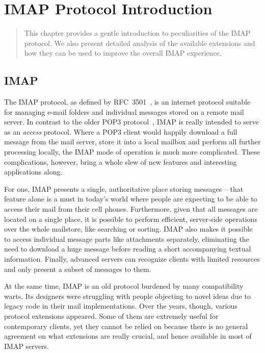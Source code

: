 \documentclass[trojita]{subfiles}
\begin{document}
\chapter{IMAP Protocol Introduction}
\label{sec:intro}

\begin{abstract}
This chapter provides a gentle introduction to peculiarities of the IMAP protocol.  We also present detailed analysis of
the available extensions and how they can be used to improve the overall IMAP experience.
\end{abstract}

\section{IMAP}

The IMAP protocol, as defined by RFC~3501~\cite{rfc-imap}, is an internet protocol suitable for managing e-mail folders
and individual messages stored on a remote mail server.  In contrast to the older POP3 protocol~\cite{rfc-pop3}, IMAP is
really intended to serve as an {\em access} protocol.  Where a POP3 client would happily download a full message from
the mail server, store it into a local mailbox and perform all further processing locally, the IMAP mode of operation is
much more complicated.  These complications, however, bring a whole slew of new features and interesting applications
along.

For one, IMAP presents a single, authoritative place storing messages -- that feature alone is a must in today's world
where people are expecting to be able to access their mail from their cell phones.  Furthermore, given that all messages
are located on a single place, it is possible to perform efficient, server-side operations over the whole mailstore,
like searching or sorting.  IMAP also makes it possible to access individual message parts like attachments separately,
eliminating the need to download a huge message before reading a short accompanying textual information.  Finally,
advanced servers can recognize clients with limited resources and only present a subset of messages to them.

At the same time, IMAP is an old protocol burdened by many compatibility warts.  Its designers were struggling with
people objecting to novel ideas due to legacy code in their mail implementations.  Over the years, though, various
protocol extensions appeared.  Some of them are extremely useful for contemporary clients, yet they cannot be relied on
because there is no general agreement on what extensions are really crucial, and hence available in most of IMAP
servers.
\end{document}
